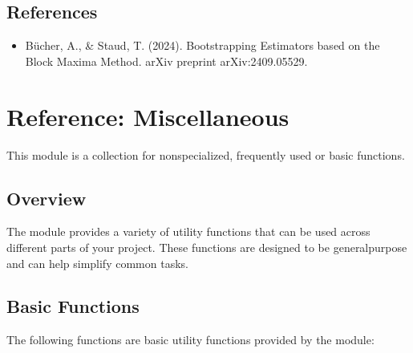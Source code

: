 \documentclass[a4paper,11pt,openany,english]{sphinxmanual}
\begin{document}
\section{References}
\label{\detokenize{api_bootstrap:id24}}\begin{itemize}
\item {} 
\sphinxAtStartPar
Bücher, A., \& Staud, T. (2024). Bootstrapping Estimators based on the Block Maxima Method. arXiv preprint arXiv:2409.05529.

\end{itemize}

\sphinxstepscope


\chapter{Reference: Miscellaneous}
\label{\detokenize{api_misc:reference-miscellaneous}}\label{\detokenize{api_misc::doc}}
\sphinxAtStartPar
This module is a collection for non\sphinxhyphen{}specialized, frequently used or basic functions.


\section{Overview}
\label{\detokenize{api_misc:overview}}
\sphinxAtStartPar
The  module provides a variety of utility functions that can be used across different parts of your project. These functions are designed to be general\sphinxhyphen{}purpose and can help simplify common tasks.


\section{Basic Functions}
\label{\detokenize{api_misc:basic-functions}}
\sphinxAtStartPar
The following functions are basic utility functions provided by the  module:
\end{document}
